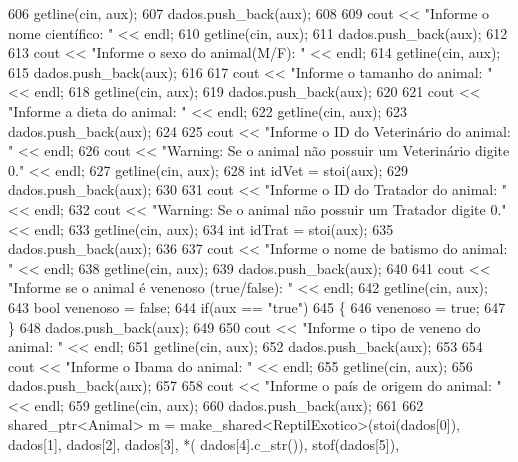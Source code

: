 \begin{DoxyCode}
606         getline(cin, aux);
607         dados.push\_back(aux);
608 
609         cout << \textcolor{stringliteral}{"Informe o nome científico:  "} << endl;
610         getline(cin, aux);
611         dados.push\_back(aux);
612 
613         cout << \textcolor{stringliteral}{"Informe o sexo do animal(M/F): "} << endl;
614         getline(cin, aux);
615         dados.push\_back(aux);
616 
617         cout << \textcolor{stringliteral}{"Informe o tamanho do animal: "} << endl;
618         getline(cin, aux);
619         dados.push\_back(aux);
620 
621         cout << \textcolor{stringliteral}{"Informe a dieta do animal: "} << endl;
622         getline(cin, aux);
623         dados.push\_back(aux);
624 
625         cout << \textcolor{stringliteral}{"Informe o ID do Veterinário do animal: "} << endl;
626         cout << \textcolor{stringliteral}{"Warning: Se o animal não possuir um Veterinário digite 0."} << endl;
627         getline(cin, aux);
628         \textcolor{keywordtype}{int} idVet = stoi(aux);
629         dados.push\_back(aux);
630 
631         cout << \textcolor{stringliteral}{"Informe o ID do Tratador do animal: "} << endl;
632         cout << \textcolor{stringliteral}{"Warning: Se o animal não possuir um Tratador digite 0."} << endl;
633         getline(cin, aux);
634         \textcolor{keywordtype}{int} idTrat = stoi(aux);
635         dados.push\_back(aux);
636 
637         cout << \textcolor{stringliteral}{"Informe o nome de batismo do animal: "} << endl;
638         getline(cin, aux);
639         dados.push\_back(aux);
640 
641         cout << \textcolor{stringliteral}{"Informe se o animal é venenoso (true/false): "} << endl;
642         getline(cin, aux);
643         \textcolor{keywordtype}{bool} venenoso = \textcolor{keyword}{false};
644         \textcolor{keywordflow}{if}(aux == \textcolor{stringliteral}{"true"})
645         \{
646             venenoso = \textcolor{keyword}{true};
647         \}
648         dados.push\_back(aux);
649 
650         cout << \textcolor{stringliteral}{"Informe o tipo de veneno do animal: "} << endl;
651         getline(cin, aux);
652         dados.push\_back(aux);
653 
654         cout << \textcolor{stringliteral}{"Informe o Ibama do animal: "} << endl;
655         getline(cin, aux);
656         dados.push\_back(aux);
657 
658         cout << \textcolor{stringliteral}{"Informe o país de origem do animal: "} << endl;
659         getline(cin, aux);
660         dados.push\_back(aux);
661 
662         shared\_ptr<Animal> m = make\_shared<ReptilExotico>(stoi(dados[0]), dados[1], dados[2], dados[3], *(
      dados[4].c\_str()), stof(dados[5]),

\end{DoxyCode}

